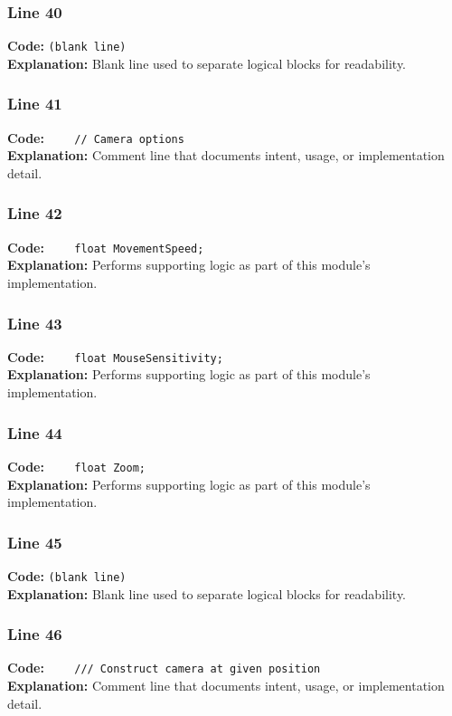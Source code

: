 \documentclass[11pt,a4paper]{article}
\begin{document}
\subsubsection*{Line 40}
\textbf{Code:} \texttt{(blank line)}\\
\textbf{Explanation:} Blank line used to separate logical blocks for readability.

\subsubsection*{Line 41}
\textbf{Code:} \verb|    // Camera options|\\
\textbf{Explanation:} Comment line that documents intent, usage, or implementation detail.

\subsubsection*{Line 42}
\textbf{Code:} \verb|    float MovementSpeed;|\\
\textbf{Explanation:} Performs supporting logic as part of this module's implementation.

\subsubsection*{Line 43}
\textbf{Code:} \verb|    float MouseSensitivity;|\\
\textbf{Explanation:} Performs supporting logic as part of this module's implementation.

\subsubsection*{Line 44}
\textbf{Code:} \verb|    float Zoom;|\\
\textbf{Explanation:} Performs supporting logic as part of this module's implementation.

\subsubsection*{Line 45}
\textbf{Code:} \texttt{(blank line)}\\
\textbf{Explanation:} Blank line used to separate logical blocks for readability.

\subsubsection*{Line 46}
\textbf{Code:} \verb|    /// Construct camera at given position|\\
\textbf{Explanation:} Comment line that documents intent, usage, or implementation detail.
\end{document}
